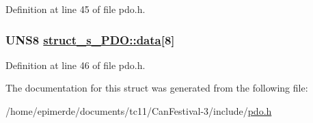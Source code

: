 Definition at line 45 of file pdo.h.\hypertarget{structstruct__s__PDO_34fdcefa8119162840bccf2d67b5c6c0}{
\subsubsection[data]{\setlength{\rightskip}{0pt plus 5cm}UNS8 \hyperlink{structstruct__s__PDO_34fdcefa8119162840bccf2d67b5c6c0}{struct\_\-s\_\-PDO::data}\mbox{[}8\mbox{]}}}
\label{structstruct__s__PDO_34fdcefa8119162840bccf2d67b5c6c0}




Definition at line 46 of file pdo.h.

The documentation for this struct was generated from the following file:\begin{CompactItemize}
\item 
/home/epimerde/documents/tc11/Can\-Festival-3/include/\hyperlink{pdo_8h}{pdo.h}\end{CompactItemize}
